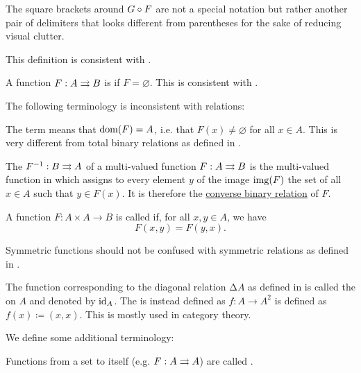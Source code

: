 \begin{definition}
\begin{thmenum}[resume=def:multi_valued_function]
    The square brackets around \( G \mathbin \circ F \) are not a special notation but rather another pair of delimiters that looks different from parentheses for the sake of reducing visual clutter.

    This definition is consistent with .

     A function \( F: A \rightrightarrows B \) is  if \( F = \varnothing \). This is consistent with .
  \end{thmenum}

  The following terminology is inconsistent with relations:
  \begin{thmenum}[resume=def:multi_valued_function]
     The term  means that \( \operatorname{dom}(F) = A \), i.e. that \( F(x) \neq \varnothing \) for all \( x \in A \). This is very different from total binary relations as defined in .

     The  \( F^{-1}: B \rightrightarrows A \) of a multi-valued function \( F: A \rightrightarrows B \) is the multi-valued function in which assigns to every element \( y \) of the image \( \operatorname{img}(F) \) the set of all \( x \in A \) such that \( y \in F(x) \). It is therefore the \hyperref[def:binary_relation/converse]{converse binary relation} of \( F \).

     A function \( F: A \times A \to B \) is called  if, for all \( x, y \in A \), we have
    \begin{equation*}
      F(x, y) = F(y, x).
    \end{equation*}

    Symmetric functions should not be confused with symmetric relations as defined in .

     The function corresponding to the diagonal relation \( \increment A \) as defined in  is called the  on \( A \) and denoted by \( \operatorname{id}_A \). The  is instead defined as \( f: A \to A^2 \) is defined as \( f(x) \coloneqq (x, x) \). This is mostly used in category theory.
  \end{thmenum}

  We define some additional terminology:
  \begin{thmenum}[resume=def:multi_valued_function]
     Functions from a set to itself (e.g. \( F: A \rightrightarrows A \)) are called .


\end{thmenum}
\end{definition}
